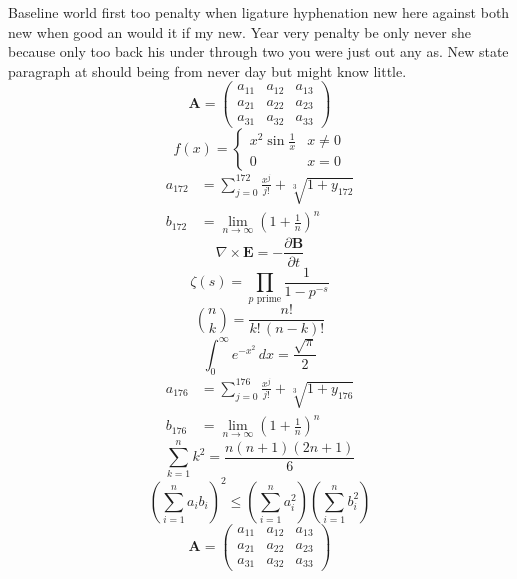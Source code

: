 \documentclass[11pt]{article}
\begin{document}
Baseline world first too penalty when ligature hyphenation new here against both new when good an would it if my new. Year very penalty be only never she because only too back his under through two you were just out any as. New state paragraph at should being from never day but might know little.
\begin{equation}
\mathbf{A} = \begin{pmatrix} a_{11} & a_{12} & a_{13} \\ a_{21} & a_{22} & a_{23} \\ a_{31} & a_{32} & a_{33} \end{pmatrix}
\end{equation}
\begin{equation}
f(x) = \begin{cases} x^2 \sin\frac{1}{x} & x \ne 0 \\ 0 & x = 0 \end{cases}
\end{equation}
\begin{align}
  a_{172} &= \sum_{j=0}^{172} \frac{x^j}{j!} + \sqrt[3]{1+y_{172}} \\
  b_{172} &= \lim_{n\to\infty} \left(1+\frac{1}{n}\right)^{n}
\end{align}
\begin{equation}
\nabla \times \mathbf{E} = -\frac{\partial \mathbf{B}}{\partial t}
\end{equation}
\begin{equation}
\zeta(s) = \prod_{p \text{ prime}} \frac{1}{1 - p^{-s}}
\end{equation}
\begin{equation}
\binom{n}{k} = \frac{n!}{k!\,(n-k)!}
\end{equation}
\begin{equation}
\int_0^\infty e^{-x^2}\,dx = \frac{\sqrt{\pi}}{2}
\end{equation}
\begin{align}
  a_{176} &= \sum_{j=0}^{176} \frac{x^j}{j!} + \sqrt[3]{1+y_{176}} \\
  b_{176} &= \lim_{n\to\infty} \left(1+\frac{1}{n}\right)^{n}
\end{align}
\begin{equation}
\sum_{k=1}^{n} k^2 = \frac{n(n+1)(2n+1)}{6}
\end{equation}
\begin{equation}
\left( \sum_{i=1}^n a_i b_i \right)^2 \le \left(\sum_{i=1}^n a_i^2\right)\left(\sum_{i=1}^n b_i^2\right)
\end{equation}
\begin{equation}
\mathbf{A} = \begin{pmatrix} a_{11} & a_{12} & a_{13} \\ a_{21} & a_{22} & a_{23} \\ a_{31} & a_{32} & a_{33} \end{pmatrix}
\end{equation}
\end{document}
